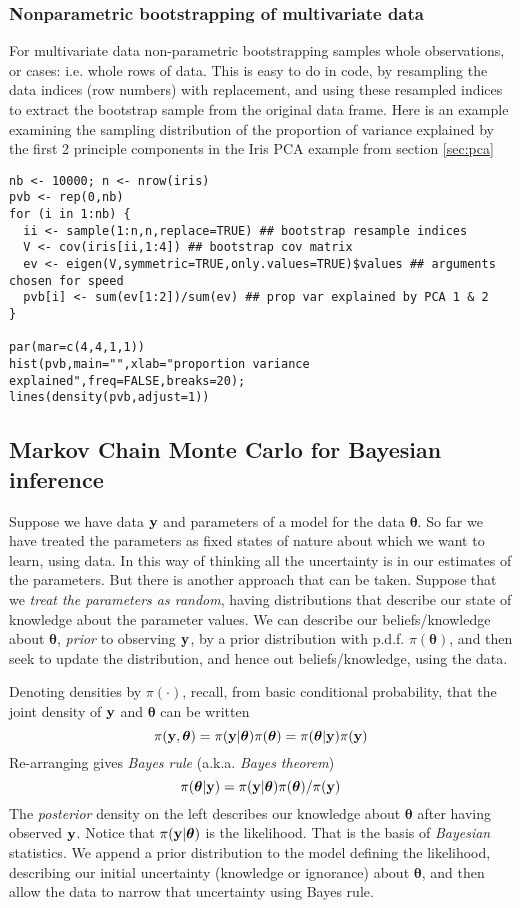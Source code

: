 \documentclass[10pt] {article}
\newcommand{\eps}[3]
{{\begin{center}
 \rotatebox{#1}{\scalebox{#2}{\texttt{[image: \#3]}}}
 \end{center}}
}
\theoremstyle{definition}
\begin{document}
\subsubsection{Nonparametric bootstrapping of multivariate data}

For multivariate data non-parametric bootstrapping samples whole observations, or cases: i.e. whole rows of data. This is easy to do in code, by resampling the data indices (row numbers) with replacement, and using these resampled indices to extract the bootstrap sample from the original data frame. Here is an example examining the sampling distribution of the proportion of variance explained by the first 2 principle components in the Iris PCA example from section \ref{sec:pca} 
\begin{lstlisting}
nb <- 10000; n <- nrow(iris)
pvb <- rep(0,nb)
for (i in 1:nb) {
  ii <- sample(1:n,n,replace=TRUE) ## bootstrap resample indices
  V <- cov(iris[ii,1:4]) ## bootstrap cov matrix
  ev <- eigen(V,symmetric=TRUE,only.values=TRUE)$values ## arguments chosen for speed
  pvb[i] <- sum(ev[1:2])/sum(ev) ## prop var explained by PCA 1 & 2
}

par(mar=c(4,4,1,1))
hist(pvb,main="",xlab="proportion variance explained",freq=FALSE,breaks=20);
lines(density(pvb,adjust=1))
\end{lstlisting}
\eps{-90}{.5}{pca-bs.eps}

\subsection{Markov Chain Monte Carlo for Bayesian inference}

Suppose we have data $\bf y$ and parameters of a model for the data $\bm \theta$. So far we have treated the parameters as fixed states of nature about which we want to learn, using data. In this way of thinking all the uncertainty is in our estimates of the parameters. But there is another approach that can be taken. Suppose that we {\em treat the parameters as random}, having distributions that describe our state of knowledge about the parameter values. We can describe our beliefs/knowledge about $\bm \theta$, {\em prior} to observing $\bf y$, by a prior distribution with p.d.f. $\pi ({\bm\theta})$, and then seek to update the distribution, and hence out beliefs/knowledge, using the data.

Denoting densities by $\pi(\cdot)$, recall, from basic conditional probability, that the joint density of ${\bf y}$ and ${\bm \theta}$ can be written
$$
\pi({\bf y}, {\bm \theta}) = \pi({\bf y} | {\bm \theta})\pi ({\bm \theta}) = \pi( {\bm \theta}|{\bf y})\pi ({\bf y})
$$
Re-arranging gives {\em Bayes rule} (a.k.a. {\em Bayes theorem})
$$
\pi( {\bm \theta}|{\bf y}) = \pi({\bf y} | {\bm \theta})\pi ({\bm \theta})/\pi({\bf y})
$$
The {\em posterior} density on the left describes our knowledge about $\bm \theta$ after having observed $\bf y$. Notice that $ \pi({\bf y} | {\bm \theta})$ is the likelihood. That is the basis of {\em Bayesian} statistics. We append a prior distribution to the model defining the likelihood, describing our initial uncertainty (knowledge or ignorance) about $\bm \theta$, and then allow the data to narrow that uncertainty using Bayes rule.
\end{document}
